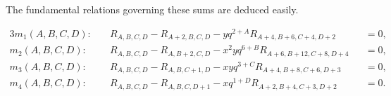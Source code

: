 
The fundamental relations governing these sums are deduced easily.
\begin{prop}
\label{prop:mod10rels}
\begin{alignat}{3}
m_1(A,B,C,D):&\quad R_{A,B,C,D}-R_{A+2,B,C,D}-yq^{2+A}R_{A+4,B+6,C+4,D+2}&&=0 \label{eqn:relm1},\\
m_2(A,B,C,D):&\quad R_{A,B,C,D}-R_{A,B+2,C,D}-x^2yq^{6+B}R_{A+6,B+12,C+8,D+4}&&=0 \label{eqn:relm2},\\
m_3(A,B,C,D):&\quad R_{A,B,C,D}-R_{A,B,C+1,D}-xyq^{3+C}R_{A+4,B+8,C+6,D+3}&&=0 \label{eqn:relm3},\\
m_4(A,B,C,D):&\quad R_{A,B,C,D}-R_{A,B,C,D+1}-xq^{1+D}R_{A+2,B+4,C+3,D+2}&&=0 \label{eqn:relm4}.
\end{alignat}
\end{prop}
